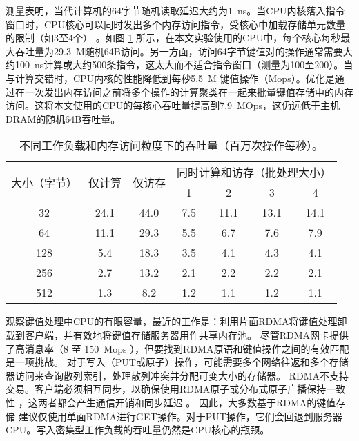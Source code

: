 测量表明，当代计算机的64字节随机读取延迟大约为1~ns。当CPU内核落入指令窗口时，CPU核心可以同时发出多个内存访问指令，受核心中加载存储单元数量的限制（如3至4个） \cite {gharachorloo1992hiding,han2010packetshader,zhang2015mega}。如图 \ref{kvdirect:tab:kv-cpu-throughput} 所示，在本文实验使用的CPU中，每个核心每秒最大吞吐量为29.3~M随机64B访问。另一方面，访问64字节键值对的操作通常需要大约100~ns计算或大约500条指令，这太大而不适合指令窗口（测量为100至200）。当与计算交错时，CPU内核的性能降低到每秒5.5~M 键值操作（Mops）。优化是通过在一次发出内存访问之前将多个操作的计算聚类在一起来批量键值存储中的内存访问\cite {li2016full,narula2014phase}。这将本文使用的CPU的每核心吞吐量提高到7.9~MOps，这仍远低于主机DRAM的随机64B吞吐量。


\begin{table}[htbp]
	\small
	\centering
	\caption{不同工作负载和内存访问粒度下的吞吐量（百万次操作每秒）。}
	\begin{tabular}{|c|c|c|c|c|c|c|}
		\hline
		\multirow{2}{*}{大小（字节）} & \multirow{2}{*}{仅计算} & \multirow{2}{*}{仅访存} & \multicolumn{4}{c|}{同时计算和访存（批处理大小）} \\\cline{4-7} 
		&  & & 1 & 2 & 3 & 4 \\\hline
		32 & 24.1 & 44.0 & 7.5 & 11.1 & 13.1 & 14.1 \\\hline
		64 & 11.1 & 29.3 & 5.5 & 6.7 & 7.6 & 7.9 \\\hline
		128 & 5.4 & 18.3 & 3.5 & 4.1 & 4.3 & 4.1 \\\hline
		256 & 2.7 & 13.2 & 2.1 & 2.2 & 2.2 & 2.1 \\\hline
		512 & 1.3 & 8.2 & 1.2 & 1.1 & 1.2 & 1.1 \\\hline
	\end{tabular}
	\label{kvdirect:tab:kv-cpu-throughput}
\end{table}


观察键值处理中CPU的有限容量，最近的工作是：利用片面RDMA将键值处理卸载到客户端，并有效地将键值存储服务器用作共享内存池。
尽管RDMA网卡提供了高消息率（8 至 150~Mops \cite {kalia2016design}），但要找到RDMA原语和键值操作之间的有效匹配是一项挑战。
对于写入（PUT或原子）操作，可能需要多个网络往返和多个存储器访问来查询散列索引，处理散列冲突并分配可变大小的存储器。
RDMA不支持交易。客户端必须相互同步，以确保使用RDMA原子或分布式原子广播保持一致性 \cite{szepesi2014designing}，这两者都会产生通信开销和同步延迟 \cite {mitchell2013using,dragojevic2014farm}。
因此，大多数基于RDMA的键值存储 \cite {mitchell2013using,dragojevic2014farm,kalia2014using}建议仅使用单面RDMA进行GET操作。对于PUT操作，它们会回退到服务器CPU。写入密集型工作负载的吞吐量仍然是CPU核心的瓶颈。

